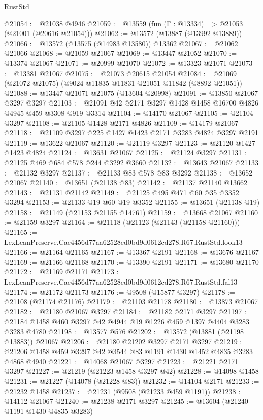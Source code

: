 \begin{lexlean}{RustStd}
\begin{coremodule}
@21054 := @21038 @4946
@21059 := @13559 (fun (Γ : @13334) => @21053 (@21001 (@20616 @21054)))
@21062 := @13572 (@13887 (@13992 @13889))
@21066 := @13572 (@13575 (@14983 @13580)) @13362
@21067 := @21062 @21066
@21068 := @21059 @21067
@21069 := @13447 @21052
@21070 := @13374 @21067
@21071 := @20999 @21070
@21072 := @13323 @21071
@21073 := @13381 @21067
@21075 := @21073 @20615 @21054
@21084 := @21069 (@21072 @21075) (@9024 @11835 @11831 @21051 @11842 (@8892 @21051))
@21088 := @13447 @21071 @21075 (@13604 @20998)
@21091 := @13850 @21067 @3297 @3297
@21103 := @21091 @42 @2171 @3297 @1428 @1458 @16700 @4826 @4945 @459 @3308 @919 @3314
@21104 := @14170 @21067
@21105 := @21104 @3297
@21108 := @21105 @1428 @2171 @4826
@21109 := @14179 @21067
@21118 := @21109 @3297 @225 @1427 @1423 @2171 @3283 @4824 @3297 @2191
@21119 := @13622 @21067
@21120 := @21119 @3297
@21123 := @21120 @1427 @1423 @4824
@21124 := @13631 @21067
@21125 := @21124 @3297
@21131 := @21125 @469 @684 @578 @244 @3292 @3660
@21132 := @13643 @21067
@21133 := @21132 @3297
@21137 := @21133 @83 @578 @83 @3292
@21138 := @13652 @21067
@21140 := @13651 (@21138 @83)
@21142 := @21137 @21140 @13662
@21143 := @21131 @21142
@21149 := @21125 @495 @471 @60 @35 @3352 @3294
@21153 := @21133 @19 @60 @19 @3352
@21155 := @13651 (@21138 @19)
@21158 := @21149 (@21153 @21155 @14761)
@21159 := @13668 @21067
@21160 := @21159 @3297
@21164 := @21118 (@21123 (@21143 (@21158 @21160)))
@21165 := LexLeanPreserve.Cae4456d77aa62528ed0bd9d0612cd278.R67.RustStd.look13
@21166 := @21164 @21165
@21167 := @13367 @2191
@21168 := @13676 @21167
@21169 := @21166 @21168
@21170 := @13390 @2191
@21171 := @13680 @21170
@21172 := @21169 @21171
@21173 := LexLeanPreserve.Cae4456d77aa62528ed0bd9d0612cd278.R67.RustStd.fal13
@21174 := @21172 @21173
@21176 := @9508 (@15877 @3297)
@21178 := @21108 (@21174 @21176)
@21179 := @21103 @21178
@21180 := @13873 @21067
@21182 := @21180 @21067 @3297
@21184 := @21182 @2171 @3297
@21197 := @21184 @1458 @460 @3297 @42 @4944 @19 @1226 @459 @1397 @4404 @3283 @3283 @4780
@21198 := @13577 @576
@21202 := @13572 (@13881 (@21198 @13883)) @21067
@21206 := @21180 @21202 @3297 @2171 @3297
@21219 := @21206 @1458 @459 @3297 @42 @3544 @83 @1191 @1430 @1452 @4835 @3283 @4868 @4940
@21221 := @14068 @21067 @3297
@21223 := @21221 @2171 @3297
@21227 := @21219 (@21223 @1458 @3297 @42)
@21228 := @14098 @1458
@21231 := @21227 (@14078 (@21228 @83))
@21232 := @14104 @2171
@21233 := @21232 @1458
@21237 := @21231 (@9508 (@21233 @459 @1191))
@21238 := @14112 @21067
@21240 := @21238 @2171 @3297
@21245 := @13604 (@21240 @1191 @1430 @4835 @3283)

\end{coremodule}
\end{lexlean}
